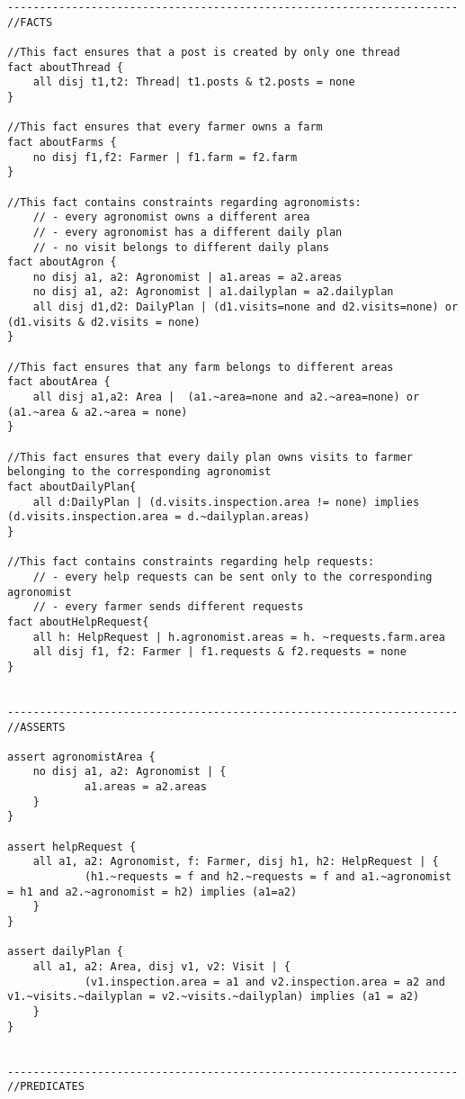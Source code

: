 \begin{lstlisting}[language=alloy]
----------------------------------------------------------------------
//FACTS

//This fact ensures that a post is created by only one thread
fact aboutThread {
	all disj t1,t2: Thread| t1.posts & t2.posts = none
}

//This fact ensures that every farmer owns a farm
fact aboutFarms {
	no disj f1,f2: Farmer | f1.farm = f2.farm
}

//This fact contains constraints regarding agronomists:
	// - every agronomist owns a different area
	// - every agronomist has a different daily plan
	// - no visit belongs to different daily plans
fact aboutAgron {
	no disj a1, a2: Agronomist | a1.areas = a2.areas
	no disj a1, a2: Agronomist | a1.dailyplan = a2.dailyplan
	all disj d1,d2: DailyPlan | (d1.visits=none and d2.visits=none) or (d1.visits & d2.visits = none)
}

//This fact ensures that any farm belongs to different areas
fact aboutArea {
	all disj a1,a2: Area |  (a1.~area=none and a2.~area=none) or (a1.~area & a2.~area = none)
}

//This fact ensures that every daily plan owns visits to farmer belonging to the corresponding agronomist
fact aboutDailyPlan{
	all d:DailyPlan | (d.visits.inspection.area != none) implies (d.visits.inspection.area = d.~dailyplan.areas)
}

//This fact contains constraints regarding help requests:
	// - every help requests can be sent only to the corresponding agronomist
	// - every farmer sends different requests
fact aboutHelpRequest{
  	all h: HelpRequest | h.agronomist.areas = h. ~requests.farm.area
  	all disj f1, f2: Farmer | f1.requests & f2.requests = none
}


----------------------------------------------------------------------
//ASSERTS

assert agronomistArea {
  	no disj a1, a2: Agronomist | {
    		a1.areas = a2.areas
  	}
}

assert helpRequest {
  	all a1, a2: Agronomist, f: Farmer, disj h1, h2: HelpRequest | {
    		(h1.~requests = f and h2.~requests = f and a1.~agronomist = h1 and a2.~agronomist = h2) implies (a1=a2)
  	}
}

assert dailyPlan {
  	all a1, a2: Area, disj v1, v2: Visit | {
    		(v1.inspection.area = a1 and v2.inspection.area = a2 and v1.~visits.~dailyplan = v2.~visits.~dailyplan) implies (a1 = a2)
  	}
}


----------------------------------------------------------------------
//PREDICATES


\end{lstlisting}
